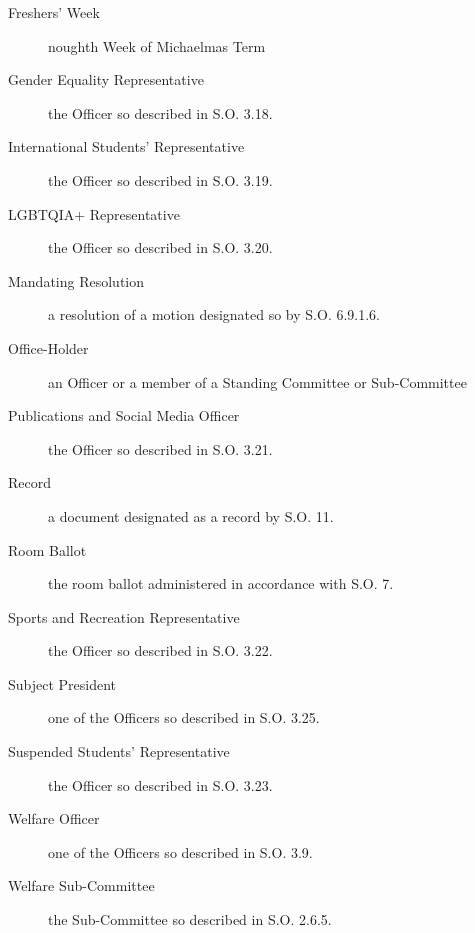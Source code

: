 \begin{description}
\item[Freshers' Week] noughth Week of Michaelmas Term
\item[Gender Equality Representative] the Officer so described in S.O. 3.18.
\item[International Students' Representative] the Officer so described in S.O. 3.19.
\item[LGBTQIA+ Representative] the Officer so described in S.O. 3.20.
\item[Mandating Resolution] a resolution of a motion designated so by S.O. 6.9.1.6.
\item[Office-Holder] an Officer or a member of a Standing Committee or Sub-Committee
\item[Publications and Social Media Officer] the Officer so described in S.O. 3.21.
\item[Record] a document designated as a record by S.O. 11.
\item[Room Ballot] the room ballot administered in accordance with S.O. 7.
\item[Sports and Recreation Representative] the Officer so described in S.O. 3.22.
\item[Subject President] one of the Officers so described in S.O. 3.25.
\item[Suspended Students’ Representative] the Officer so described in S.O. 3.23.
\item[Welfare Officer] one of the Officers so described in S.O. 3.9.
\item[Welfare Sub-Committee] the Sub-Committee so described in S.O. 2.6.5.
\end{description}